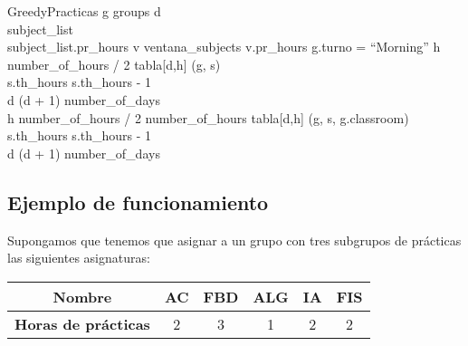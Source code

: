 \begin{pseudocode}{GreedyPracticas}{ }
    \label{greedypracticas}
    \FOREACH g \in groups \DO
    \BEGIN
        d  \\
        subject\_list \GETS {}\\
        \WHILE \sum subject\_list.pr\_hours  \DO
        \BEGIN
            \FOREACH v \in ventana\_subjects \DO
            \BEGIN
                \IF v.pr\_hours  \DO
                \BEGIN
                    \IF g.turno = ``Morning'' \DO
                    \BEGIN
                        \FOR h  \TO number\_of\_hours / 2 \DO
                        \BEGIN
                            \IF {} \DO
                            \BEGIN
                                tabla[d,h] \GETS (g, s)\\
                                s.th\_hours \GETS s.th\_hours - 1\\
                                d \GETS (d + 1) \bmod number\_of\_days\\
                                \BREAK
                            \END
                        \END
                    \END
                    \ELSE \DO
                    \BEGIN
                        \FOR h \GETS number\_of\_hours / 2 \TO number\_of\_hours \DO
                        \BEGIN
                            \IF {} \DO
                            \BEGIN
                                tabla[d,h] \GETS (g, s, g.classroom)\\
                                s.th\_hours \GETS s.th\_hours - 1\\
                                d \GETS (d + 1) \bmod number\_of\_days\\
                                \BREAK
                            \END
                        \END
                    \END
                \END
            \END
        \END
    \END
\end{pseudocode}

\subsection{Ejemplo de funcionamiento}
Supongamos que tenemos que asignar a un grupo con tres subgrupos de prácticas las siguientes asignaturas:

\begin{tabular}{c | c  c  c  c  c}
\textbf{Nombre} & AC & FBD & ALG & IA & FIS \\
\hline
\textbf{Horas de prácticas}  & 2 & 3 & 1 & 2 & 2 \\
\end{tabular}


